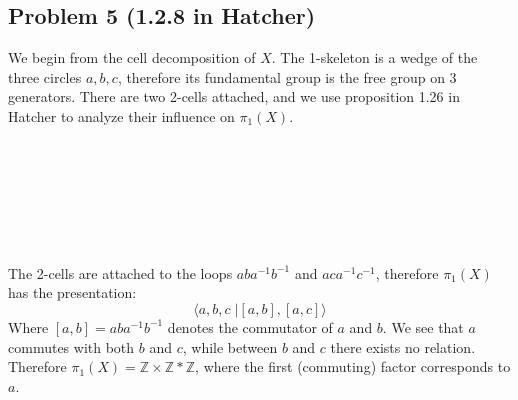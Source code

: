 \documentclass[12 pt]{article}
\newcommand{\Z}{\mathbb{Z}}
\begin{document}
\subsection*{Problem 5 (1.2.8 in Hatcher)}
We begin from the cell decomposition of $X$. The 1-skeleton is a wedge of the three circles $a,b,c$, therefore its fundamental group is the free group on 3 generators. There are two 2-cells attached, and we use proposition 1.26 in Hatcher to analyze their influence on $\pi_1(X)$.
\\
\\
\\
\\
\\
\\
\\
\\
The 2-cells are attached to the loops $aba^{-1}b^{-1}$ and $aca^{-1}c^{-1}$, therefore $\pi_1(X)$ has the presentation:
\[         \langle  a,b,c \;| [a,b] , [a,c] \rangle     \]
Where $[a,b] = aba^{-1}b^{-1}$ denotes the commutator of $a$ and $b$. We see that $a$ commutes with both $b$ and $c$, while between $b$ and $c$ there exists no relation. Therefore $\pi_1(X) = \Z \times \Z * \Z$, where the first (commuting) factor corresponds to $a$.
\end{document}
